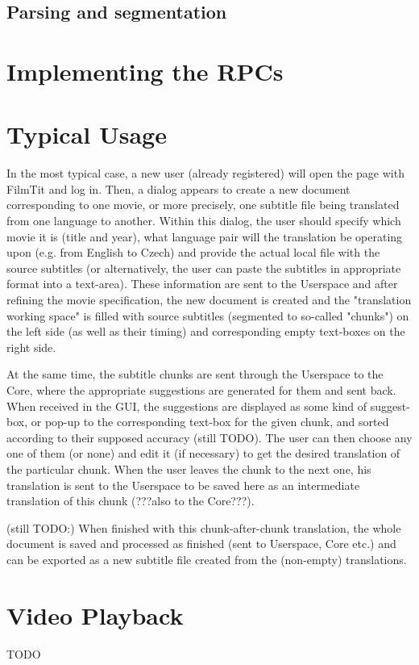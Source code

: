 \subsection{Parsing and segmentation}

\section{Implementing the RPCs}


\section{Typical Usage}
In the most typical case, a new user (already registered) will open the page with FilmTit and log in. Then, a dialog appears to create a new document corresponding to one movie, or more precisely, one subtitle file being translated from one language to another. Within this dialog, the user should specify which movie it is (title and year), what language pair will the translation be operating upon (e.g. from English to Czech) and provide the actual local file with the source subtitles (or alternatively, the user can paste the subtitles in appropriate format into a text-area). These information are sent to the Userspace and after refining the movie specification, the new document is created and the "translation working space" is filled with source subtitles (segmented to so-called "chunks") on the left side (as well as their timing) and corresponding empty text-boxes on the right side.

At the same time, the subtitle chunks are sent through the Userspace to the Core, where the appropriate suggestions are generated for them and sent back. When received in the GUI, the suggestions are displayed as some kind of suggest-box, or pop-up to the corresponding text-box for the given chunk, and sorted according to their supposed accuracy (still TODO). The user can then choose any one of them (or none) and edit it (if necessary) to get the desired translation of the particular chunk. When the user leaves the chunk to the next one, his translation is sent to the Userspace to be saved here as an intermediate translation of this chunk (???also to the Core???).

(still TODO:)
When finished with this chunk-after-chunk translation, the whole document is saved and processed as finished (sent to Userspace, Core etc.) and can be exported as a new subtitle file created from the (non-empty) translations.

\section{Video Playback}

TODO 
